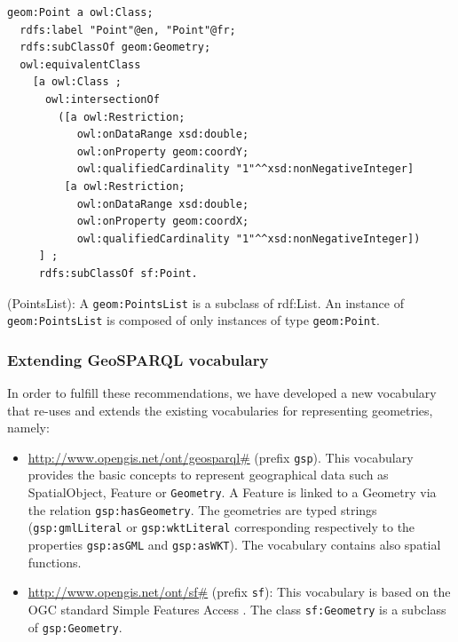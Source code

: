 \begin{lstlisting}
geom:Point a owl:Class;
  rdfs:label "Point"@en, "Point"@fr;
  rdfs:subClassOf geom:Geometry;
  owl:equivalentClass
    [a owl:Class ;
	  owl:intersectionOf
		([a owl:Restriction;
		   owl:onDataRange xsd:double;
		   owl:onProperty geom:coordY;
	       owl:qualifiedCardinality "1"^^xsd:nonNegativeInteger]
         [a owl:Restriction;
		   owl:onDataRange xsd:double;
		   owl:onProperty geom:coordX;
		   owl:qualifiedCardinality "1"^^xsd:nonNegativeInteger])
     ] ;
     rdfs:subClassOf sf:Point.
\end{lstlisting}

\begin{deflda}
(PointsList): A \texttt{geom:PointsList} is a subclass of rdf:List. An instance of \texttt{geom:PointsList} is composed of only instances of type \texttt{geom:Point}.

\end{deflda}

\subsubsection*{Extending GeoSPARQL vocabulary}
In order to fulfill these recommendations, we have developed a new vocabulary that re-uses and extends the existing vocabularies for representing geometries, namely:
\begin{itemize}
 \item \url{http://www.opengis.net/ont/geosparql#} (prefix \texttt{gsp}). This vocabulary provides the basic concepts to represent geographical data such as SpatialObject, Feature or \texttt{Geometry}. A Feature is linked to a Geometry via the relation \texttt{gsp:hasGeometry}. The geometries are typed strings (\texttt{gsp:gmlLiteral} or \texttt{gsp:wktLiteral} corresponding respectively to the properties \texttt{gsp:asGML} and \texttt{gsp:asWKT}). The vocabulary contains also spatial functions.
 \item \url{http://www.opengis.net/ont/sf#} (prefix \texttt{sf}): This vocabulary is based on the OGC standard Simple Features Access \cite{iso2004}. The class \texttt{sf:Geometry} is a subclass of \texttt{gsp:Geometry}. 
\end{itemize}
 

